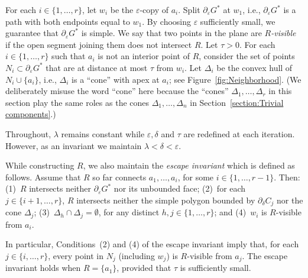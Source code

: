 \documentclass[11pt]{patmorin}
\begin{document}
For each $i\in \{1,\dots,r\}$, let $w_i$ be the $\varepsilon$-copy of  $a_i$.
Split $\partial_\varepsilon G^*$ at $w_1$, i.e., $\partial_\varepsilon G^*$ is a path with both endpoints equal to $w_1$.
By choosing $\varepsilon$ sufficiently small, we guarantee that $\partial_\varepsilon G^*$ is simple.
We say that two points in the plane are \emph{$R$-visible} if the open segment joining them does not intersect $R$.
Let $\tau >0$. For each $i\in \{1,\dots,r\}$ such that $a_i$ is not an interior point of $R$, consider the set of points $N_i\subset \partial_\varepsilon G^*$ that are at distance at most $\tau$ from $w_i$.
Let $\Delta_i$ be the convex hull of $N_i\cup \{a_i\}$, i.e., $\Delta_i$ is a ``cone'' with apex at $a_i$; see Figure~\ref{fig:Neighborhood}. (We deliberately misuse the word ``cone'' here because the ``cones'' $\Delta_1,\ldots,\Delta_r$ in this section play the same roles as the cones $\Delta_1,\ldots,\Delta_n$ in Section~\ref{section:Trivial components}.)

Throughout, $\lambda$ remains constant while $\varepsilon, \delta$ and $\tau$ are redefined at each iteration. However, as an invariant we maintain $\lambda < \delta < \varepsilon$.


While constructing $R$, we also maintain the \emph{escape invariant} which is defined as follows. Assume that $R$ so far connects $a_1,\ldots,a_i$, for some $i\in \{1,\dots,r-1\}$. Then: (1)~$R$ intersects neither $\partial_\varepsilon G^*$ nor its unbounded face; (2)~for each $j\in\{i+1,\ldots,r\}$, $R$ intersects neither the simple polygon bounded by $\partial_\delta C_j$ nor the cone $\Delta_j$; (3)~$\Delta_h\cap \Delta_j = \emptyset$, for any distinct $h,j\in\{1,\ldots,r\}$; and (4)~$w_i$ is $R$-visible from $a_i$.

In particular, Conditions~(2) and (4) of the escape invariant imply that, for
each $j\in\{i,\ldots,r\}$, every point in $N_j$ (including $w_j$) is
$R$-visible from $a_j$.  The escape invariant holds when $R=\{a_1\}$,
provided that $\tau$ is sufficiently small.
\end{document}
